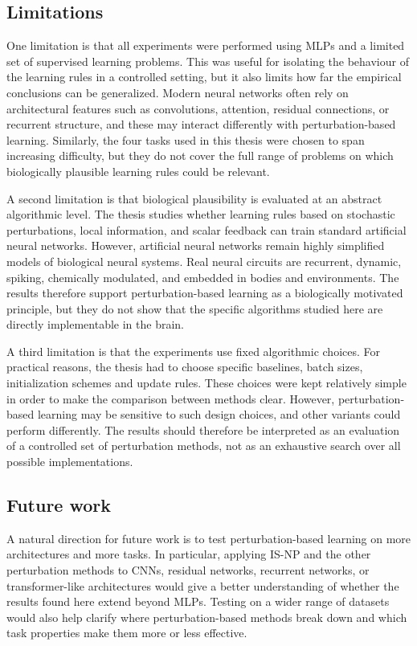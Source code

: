 \subsection{Limitations}

One limitation is that all experiments were performed using MLPs and a limited set of supervised learning problems. This was useful for isolating the behaviour of the learning rules in a controlled setting, but it also limits how far the empirical conclusions can be generalized. Modern neural networks often rely on architectural features such as convolutions, attention, residual connections, or recurrent structure, and these may interact differently with perturbation-based learning. Similarly, the four tasks used in this thesis were chosen to span increasing difficulty, but they do not cover the full range of problems on which biologically plausible learning rules could be relevant.

A second limitation is that biological plausibility is evaluated at an abstract algorithmic level. The thesis studies whether learning rules based on stochastic perturbations, local information, and scalar feedback can train standard artificial neural networks. However, artificial neural networks remain highly simplified models of biological neural systems. Real neural circuits are recurrent, dynamic, spiking, chemically modulated, and embedded in bodies and environments. The results therefore support perturbation-based learning as a biologically motivated principle, but they do not show that the specific algorithms studied here are directly implementable in the brain.

A third limitation is that the experiments use fixed algorithmic choices. For practical reasons, the thesis had to choose specific baselines, batch sizes, initialization schemes and update rules. These choices were kept relatively simple in order to make the comparison between methods clear. However, perturbation-based learning may be sensitive to such design choices, and other variants could perform differently. The results should therefore be interpreted as an evaluation of a controlled set of perturbation methods, not as an exhaustive search over all possible implementations.

\subsection{Future work}

A natural direction for future work is to test perturbation-based learning on more architectures and more tasks. In particular, applying IS-NP and the other perturbation methods to CNNs, residual networks, recurrent networks, or transformer-like architectures would give a better understanding of whether the results found here extend beyond MLPs. Testing on a wider range of datasets would also help clarify where perturbation-based methods break down and which task properties make them more or less effective.

